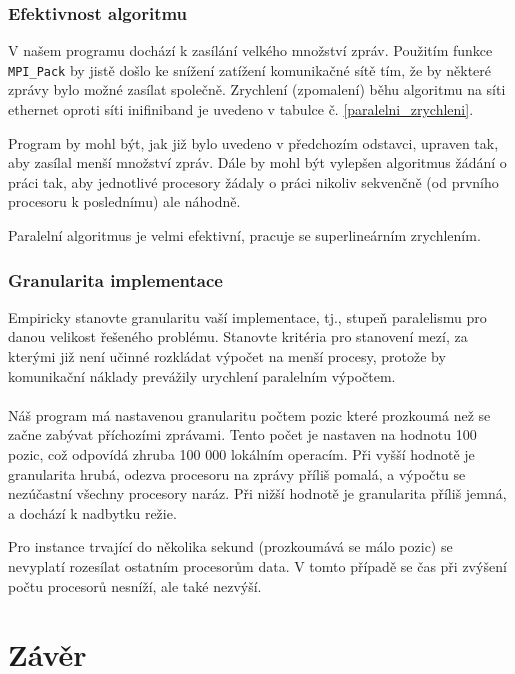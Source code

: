 \documentclass[12pt]{article}
\begin{document}
\subsubsection{Efektivnost algoritmu}
V našem programu dochází k zasílání velkého množství zpráv. Použitím funkce \texttt{MPI\_Pack} by jistě došlo ke snížení zatížení komunikačné sítě tím, že by některé zprávy bylo možné zasílat společně. Zrychlení (zpomalení) běhu algoritmu na síti ethernet oproti síti inifiniband je uvedeno v tabulce č. \ref{paralelni_zrychleni}.

Program by mohl být, jak již bylo uvedeno v předchozím odstavci, upraven tak, aby zasílal menší množství zpráv. Dále by mohl být vylepšen algoritmus žádání o práci tak, aby jednotlivé procesory žádaly o práci nikoliv sekvenčně (od prvního procesoru k poslednímu) ale náhodně.

Paralelní algoritmus je velmi efektivní, pracuje se superlineárním zrychlením. 

\subsubsection{Granularita implementace}
Empiricky stanovte granularitu vaší implementace, tj., stupeň paralelismu pro danou
velikost řešeného problému. Stanovte kritéria pro stanovení mezí, za
kterými již není učinné rozkládat výpočet na menší procesy, protože
by komunikační náklady prevážily urychlení paralelním výpočtem.
\\
\\

Náš program má nastavenou granularitu počtem pozic které prozkoumá než se začne zabývat příchozími zprávami. Tento počet je nastaven na hodnotu 100 pozic, což odpovídá zhruba 100 000 lokálním operacím. Při vyšší hodnotě je granularita hrubá, odezva procesoru na zprávy příliš pomalá, a výpočtu se nezúčastní všechny procesory naráz. Při nižší hodnotě je granularita příliš jemná, a dochází k nadbytku režie.

Pro instance trvající do několika sekund (prozkoumává se málo pozic) se nevyplatí rozesílat ostatním procesorům data. V tomto případě se čas při zvýšení počtu procesorů nesníží, ale také nezvýší.

\section{Závěr}
\end{document}
